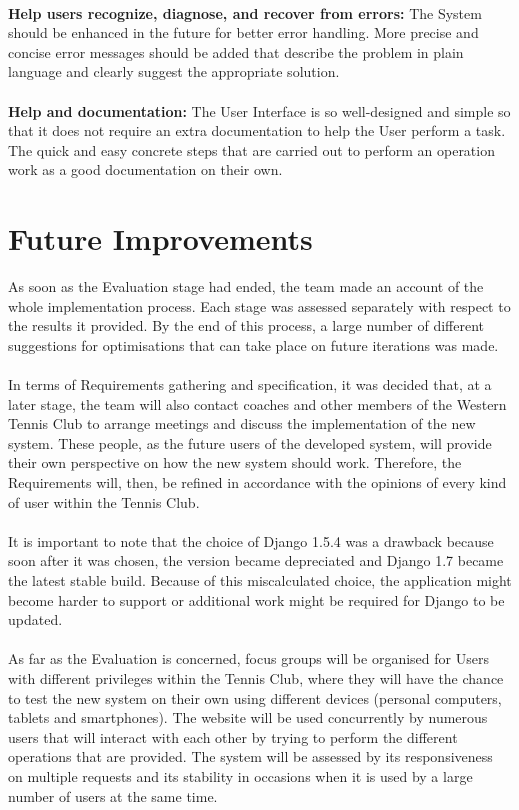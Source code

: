 \documentclass{l3proj}
\begin{document}
 \\
\textbf{Help users recognize, diagnose, and recover from errors:}
The System should be enhanced in the future for better error handling. More precise and concise error messages should be added that describe the problem in plain language and clearly suggest the appropriate solution.\\
 \\
\textbf{Help and documentation:}
The User Interface is so well-designed and simple so that it does not require an extra documentation to help the User perform a task. The quick and easy concrete steps that are carried out to perform an operation work as a good documentation on their own.\\

\section{Future Improvements}
As soon as the Evaluation stage had ended, the team made an account of the whole implementation process. Each stage was assessed separately with respect to the results it provided. By the end of this process, a large number of different suggestions for optimisations that can take place on future iterations was made.\\
\\ In terms of Requirements gathering and specification, it was decided that, at a later stage, the team will also contact coaches and other members of the Western Tennis Club to arrange meetings and discuss the implementation of the new system. These people, as the future users of the developed system, will provide their own perspective on how the new system should work. Therefore, the Requirements will, then, be refined in accordance with the opinions of every kind of user within the Tennis Club.\\
\\ It is important to note that the choice of Django 1.5.4 was a drawback because soon after it was chosen, the version became depreciated and Django 1.7 became the latest stable build. Because of this miscalculated choice, the application might become harder to support or additional work might be required for Django to be updated.\\
\\ As far as the Evaluation is concerned, focus groups will be organised for Users with different privileges within the Tennis Club, where they will have the chance to test the new system on their own using different devices (personal computers, tablets and smartphones). The website will be used concurrently by numerous users that will interact with each other by trying to perform the different operations that are provided.  The system will be assessed by its responsiveness on multiple requests and its stability in occasions when it is used by a large number of users at the same time.


\end{document}

